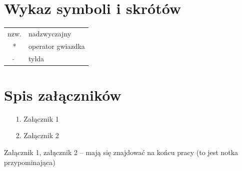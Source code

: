 \documentclass[en]{minipw} %
\begin{document}
\chapter*{Wykaz symboli i skrótów}

\begin{tabular}{cl}
nzw. & nadzwyczajny \\
* & operator gwiazdka \\
$\widetilde{}$ & tylda
\end{tabular}


\listoffigures


\renewcommand{\listtablename}{Spis tabel}
\listoftables


\chapter*{Spis załączników}
\begin{enumerate}
\item[1.] Załącznik 1
\item[2.] Załącznik 2
\end{enumerate}

\newpage
\pagestyle{empty}
Załącznik 1, załącznik 2 -- mają się znajdować na końcu pracy (to jest notka przypominająca)
\end{document}
